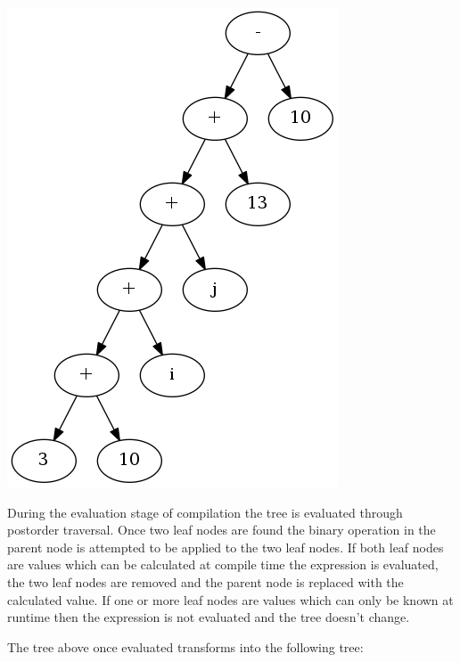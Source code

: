 \begin{center}
\includegraphics[scale=0.4]{graphs/evalTree.png}
\end{center}

During the evaluation stage of compilation the tree is evaluated through
postorder traversal. Once two leaf nodes are found the binary operation in the parent node
is attempted to be applied to the two leaf nodes. If both leaf nodes are values which
can be calculated at compile time the expression is evaluated, the two leaf nodes
are removed and the parent node is replaced with the calculated value. If one or
more leaf nodes are values which can only be known at runtime then the expression is
not evaluated and the tree doesn't change. 

The tree above once evaluated transforms into the following tree: 

